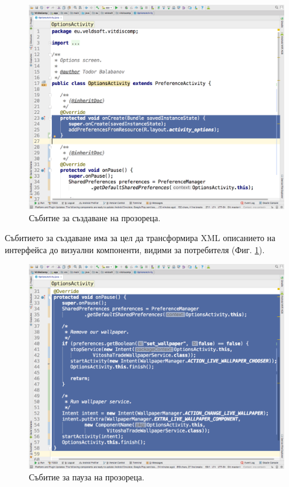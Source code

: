 \documentclass[book,14pt,oneside,openany]{memoir}
\begin{document}
\begin{figure}[h]
  \centering
  \includegraphics[height=0.45\pdfpageheight]{./images/pic0028.png}
  \caption{Събитие за създаване на прозореца.}
\label{fig:pic0028}
\end{figure}
\FloatBarrier

Събитието за създаване има за цел да трансформира XML описанието на интерфейса до визуални компоненти, видими за потребителя (Фиг. \ref{fig:pic0028}). 

\begin{figure}[h]
  \centering
  \includegraphics[height=0.45\pdfpageheight]{./images/pic0029.png}
  \caption{Събитие за пауза на прозореца.}
\label{fig:pic0029}
\end{figure}
\FloatBarrier
\end{document}
